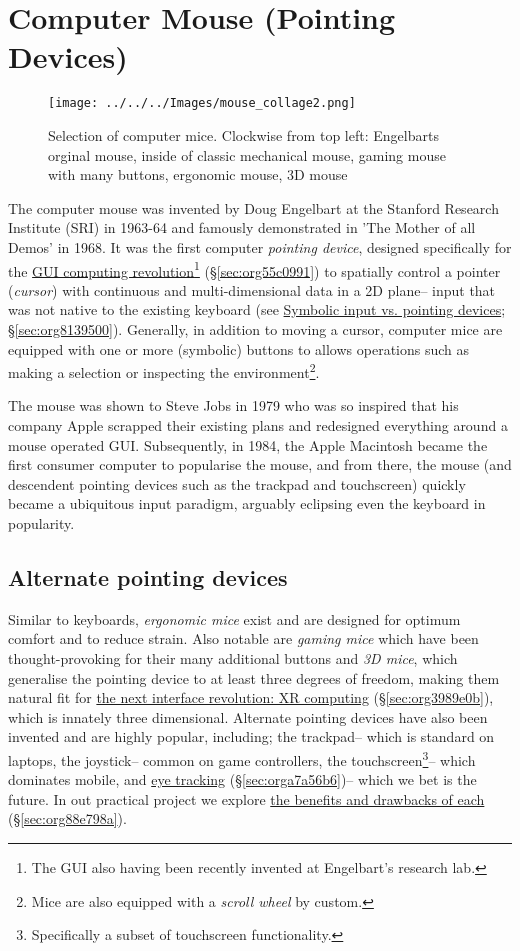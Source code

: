 \documentclass[logo,bsc,singlespacing,parskip]{infthesis}
\begin{document}
\chapter{Computer Mouse (Pointing Devices)}
\label{sec:orgbf9479d}
\begin{figure}[h]
\centering
\texttt{[image: ../../../Images/mouse\_collage2.png]}
\caption[Computer mouse collage]{Selection of computer mice. Clockwise from top left: Engelbarts orginal mouse, inside of classic mechanical mouse, gaming mouse with many buttons, ergonomic mouse, 3D mouse}
\end{figure}
The computer mouse was invented by Doug Engelbart at the Stanford Research Institute (SRI) in 1963-64 and famously demonstrated in 'The Mother of all Demos' in 1968.
It was the first computer \emph{pointing device}, designed specifically for the \hyperref[sec:org55c0991]{GUI computing revolution}\footnote{The GUI also having been recently invented at Engelbart's research lab.} (\S \ref{sec:org55c0991}) to spatially control a pointer (\emph{cursor}) with continuous and multi-dimensional data in a 2D plane-- input that was not native to the existing keyboard (see \hyperref[sec:org8139500]{Symbolic input vs. pointing  devices}; \S \ref{sec:org8139500}).
Generally, in addition to moving a cursor, computer mice are equipped with one or more (symbolic) buttons to allows operations such as making a selection or inspecting the environment\footnote{Mice are also equipped with a \emph{scroll wheel} by custom.}.

The mouse was shown to Steve Jobs in 1979 who was so inspired that his company Apple scrapped their existing plans and redesigned everything around a mouse operated GUI.
Subsequently, in 1984, the Apple Macintosh became the first consumer computer to popularise the mouse, and from there, the mouse (and descendent pointing devices such as the trackpad and touchscreen) quickly became a ubiquitous input paradigm, arguably eclipsing even the keyboard in popularity.

\section{Alternate pointing devices}
\label{sec:orga7d624a}
Similar to keyboards, \emph{ergonomic mice} exist and are designed for optimum comfort and to reduce strain.
Also notable are \emph{gaming mice} which have been thought-provoking for their many additional buttons and \emph{3D mice}, which generalise the pointing device to at least three degrees of freedom, making them natural fit for \hyperref[sec:org3989e0b]{the next interface revolution: XR computing} (\S  \ref{sec:org3989e0b}), which is innately three dimensional.
Alternate pointing devices have also been invented and are highly popular, including; the trackpad-- which is standard on laptops, the joystick-- common on game controllers, the touchscreen\footnote{Specifically a subset of touchscreen functionality.}-- which dominates mobile, and \hyperref[sec:orga7a56b6]{eye tracking} (\S \ref{sec:orga7a56b6})-- which we bet is the future.
In out practical project we explore \hyperref[sec:org88e798a]{the benefits and drawbacks of each} (\S \ref{sec:org88e798a}).
\end{document}
